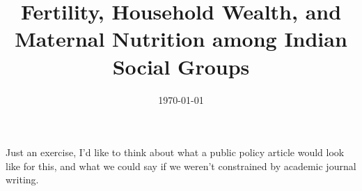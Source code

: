 \documentclass[12pt]{article}
\begin{document}
\title{Fertility, Household Wealth, and Maternal Nutrition among Indian Social Groups}
\date{\today}
\maketitle






\begin{table}[!htbp]
    \centering
    \begin{threeparttable}[t]
        \label{tab:sumstats}

        \scriptsize
        \setlength{\tabcolsep}{2pt}
        \renewcommand{\arraystretch}{1.2}

        
    \end{threeparttable}
\end{table}



\begin{table}[!htbp]
    \centering
    \begin{threeparttable}[t]
        \label{tab:sumstats}

        \scriptsize
        \setlength{\tabcolsep}{2pt}
        \renewcommand{\arraystretch}{1.2}

        
    \end{threeparttable}
\end{table}

Just an exercise, I'd like to think about what a public policy article would look like for this, and what we could say if we weren't constrained by academic journal writing.
\end{document}
